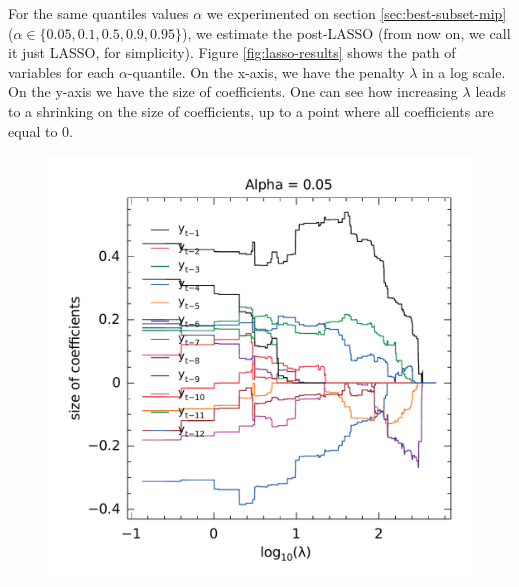 For the same quantiles values $\alpha$ we experimented on section \ref{sec:best-subset-mip} ($\alpha \in \{0.05, 0.1, 0.5, 0.9, 0.95\}$), we estimate the post-LASSO (from now on, we call it just LASSO, for simplicity). Figure \ref{fig:lasso-results} shows the path of variables for each $\alpha$-quantile. On the x-axis, we have the penalty $\lambda$ in a log scale. On the y-axis we have the size of coefficients. One can see how increasing $\lambda$ leads to a shrinking on the size of coefficients, up to a point where all coefficients are equal to 0.
\begin{figure}
	\centering
	\begin{minipage}[t]{0.4\linewidth}
		\centering
		\begin{minipage}[t]{\linewidth}
			\centering     \includegraphics[width=\textwidth]{Figuras/selecao-lasso/par-sellasso-005.pdf}
		\end{minipage}
		\begin{minipage}[b]{\linewidth}

\end{minipage}
\end{minipage}
\end{figure}
